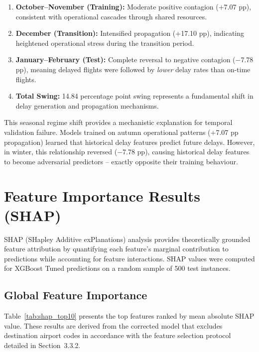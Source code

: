 \documentclass{report}
\begin{document}
\begin{enumerate}
\item \textbf{October--November (Training):} Moderate positive contagion
  ($+$7.07 pp), consistent with operational cascades through shared
  resources.
\item \textbf{December (Transition):} Intensified propagation
  ($+$17.10 pp), indicating heightened operational stress during the
  transition period.
\item \textbf{January--February (Test):} Complete reversal to negative
  contagion ($-$7.78 pp), meaning delayed flights were followed by
  \emph{lower} delay rates than on-time flights.
\item \textbf{Total Swing:} 14.84 percentage point swing represents a
  fundamental shift in delay generation and propagation mechanisms.
\end{enumerate}

This seasonal regime shift provides a mechanistic explanation for temporal
validation failure.  Models trained on autumn operational patterns
($+$7.07 pp propagation) learned that historical delay features predict
future delays.  However, in winter, this relationship reversed ($-$7.78 pp),
causing historical delay features to become adversarial predictors --
exactly opposite their training behaviour.

\section{Feature Importance Results (SHAP)}
\label{sec:shap}

SHAP (SHapley Additive exPlanations) analysis provides theoretically
grounded feature attribution by quantifying each feature's marginal
contribution to predictions while accounting for feature interactions.
SHAP values were computed for XGBoost Tuned predictions on a random sample
of 500 test instances.

\subsection{Global Feature Importance}

Table~\ref{tab:shap_top10} presents the top features ranked by mean absolute
SHAP value.  These results are derived from the corrected model that
excludes destination airport codes in accordance with the feature selection
protocol detailed in Section~3.3.2.
\end{document}
